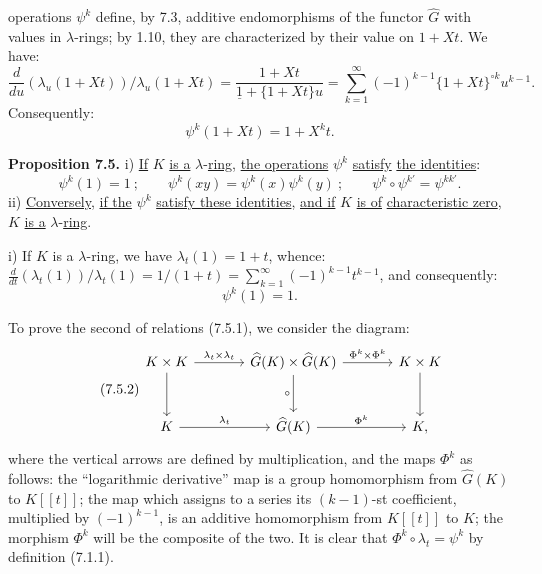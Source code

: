 %
operations \(\psi^k\) define, by 7.3, additive endomorphisms of the functor \(\widehat G\) with values in \(\lambda\)-rings; by 1.10, they are characterized by their value on \(1+Xt\). We have:
\[
  \frac{d}{du}(\lambda_u(1+Xt))/\lambda_u(1+Xt)
  =
  \frac{1+Xt}{\underline{1}+\{1+Xt\}u}
  =
  \sum_{k=1}^{\infty}(-1)^{k-1}\{1+Xt\}^{\circ k}u^{k-1}.
\]
Consequently:
\begin{equation}\tag{7.4.1}
  \psi^k(1+Xt)=1+X^k t.
\end{equation}

\textbf{Proposition 7.5.} i) \uline{If} \(K\) \uline{is a} \(\lambda\)-\uline{ring}, \uline{the operations} \(\psi^k\) \uline{satisfy} \uline{the identities}:
\begin{equation}\tag{7.5.1}
  \psi^k(1)=1~;\qquad
  \psi^k(xy)=\psi^k(x)\psi^k(y)~;\qquad
  \psi^k\circ\psi^{k'}=\psi^{kk'}.
\end{equation}
ii) \uline{Conversely}, \uline{if the} \(\psi^k\) \uline{satisfy these identities}, \uline{and if} \(K\) \uline{is of} \uline{characteristic zero}, \(K\) \uline{is a} \(\lambda\)-\uline{ring}.

i) If \(K\) is a \(\lambda\)-ring, we have \(\lambda_t(1)=1+t\), whence: \(\frac{d}{dt}(\lambda_t(1))/\lambda_t(1)=1/(1+t)=\sum_{k=1}^{\infty}(-1)^{k-1}t^{k-1}\), and consequently:
\[
  \psi^k(1)=1.
\]

To prove the second of relations (7.5.1), we consider the diagram:
\begin{equation}\tag{7.5.2}
\begin{tikzcd}[column sep=large,row sep=large]
K\times K \arrow[r,"\lambda_t\times\lambda_t"] \arrow[d] &
\widehat G(K)\times\widehat G(K) \arrow[r,"\Phi^k\times\Phi^k"] \arrow[d,"\circ"'] &
K\times K \arrow[d]\\
K \arrow[r,"\lambda_t"] &
\widehat G(K) \arrow[r,"\Phi^k"] &
K ,
\end{tikzcd}
\end{equation}
where the vertical arrows are defined by multiplication, and the maps \(\Phi^k\) as follows: the ``logarithmic derivative'' map is
%
a group homomorphism from \(\widehat G(K)\) to \(K[[t]]\); the map which assigns to a series its \((k-1)\)-st coefficient, multiplied by \((-1)^{k-1}\), is an additive homomorphism from \(K[[t]]\) to \(K\); the morphism \(\Phi^k\) will be the composite of the two. It is clear that \(\Phi^k\circ\lambda_t=\psi^k\) by definition (7.1.1).

